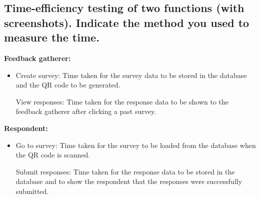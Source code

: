\documentclass[letterpaper, 12 pt, conference]{ieeeconf}
\begin{document}
\subsection{Time-eﬀiciency testing of two functions (with screenshots). Indicate the method you used to measure the time.}
\newline
\hfill \break

\textbf{Feedback gatherer:}
\begin{itemize}
    \item[] Create survey: Time taken for the survey data to be stored in the database and the QR code to be generated.

View responses: Time taken for the response data to be shown to the feedback gatherer after clicking a past survey. 
\end{itemize}
\newline
\hfill \break


\textbf{Respondent:}
\begin{itemize}
    \item[] Go to survey: Time taken for the survey to be loaded from the database when the QR code is scanned.

Submit responses: Time taken for the response data to be stored in the database and to show the respondent that the responses were successfully submitted.
\end{itemize}



\addtolength{\textheight}{-12cm}








\newpage





\end{document}
